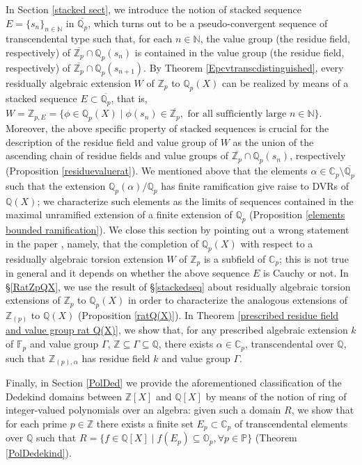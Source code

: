 \documentclass[10pt]{article}
\numberwithin{equation}{section}
\theoremstyle{definition}\newtheorem{Def}[equation]{Definition}
\theoremstyle{definition}\newtheorem{Ques}[equation]{Question}
\newcommand{\F}{\mathbb{F}}
\newcommand{\Q}{\mathbb{Q}}
\newcommand{\N}{\mathbb{N}}
\newcommand{\Z}{\mathbb{Z}}
\renewcommand{\O}{\mathbb{O}}
\newcommand{\C}{\mathbb{C}}
\newcommand{\PP}{\mathbb{P}}
\newcommand{\oQp}{\overline{\Q_p}}
\newcommand{\oZp}{\overline{\Z_p}}
\begin{document}
In Section \ref{stacked sect}, we introduce the notion of stacked sequence $E=\{s_n\}_{n\in\N}$ in $\oQp$, which turns out to be a pseudo-convergent sequence  of transcendental type such that, for each $n\in\N$, the value group (the residue field, respectively) of $\oZp\cap\Q_p(s_n)$ is contained in the value group (the residue field, respectively) of $\oZp\cap\Q_p(s_{n+1})$. By Theorem \ref{Epcvtranscdistinguished}, every residually algebraic extension $W$ of $\Z_p$ to $\Q_p(X)$ can be realized by means of a stacked sequence $E\subset\oQp$, that is, $W=\Z_{p,E}=\{\phi\in\Q_p(X)\mid\phi(s_n)\in\oZp,\text{ for all sufficiently large }n\in\N\}$. Moreover, the above specific property of stacked sequences is crucial for the description of the residue field and value group of $W$ as the union of the ascending chain of residue fields and value groups of $\oZp\cap\Q_p(s_n)$, respectively  (Proposition \ref{residuevaluerat}).  We mentioned above that the elements $\alpha\in\C_p\setminus\oQp$ such that the extension $\Q_p(\alpha)/\Q_p$ has finite ramification give raise to DVRs of $\Q(X)$; we characterize such elements as the limits of sequences contained in the maximal unramified extension of a finite extension of $\Q_p$ (Proposition \ref{elements bounded ramification}). We close this section by pointing out a wrong statement in the paper \cite{IovZah}, namely, that the completion of $\Q_p(X)$ with respect to a residually algebraic torsion extension $W$ of $\Z_p$ is a subfield of $\C_p$; this is not true in general and  it depends on whether the above sequence $E$ is Cauchy or not. In \S \ref{RatZpQX}, we use the result of \S \ref{stackedseq} about residually algebraic torsion extensions of $\Z_p$ to $\Q_p(X)$ in order to characterize the analogous extensions of $\Z_{(p)}$ to $\Q(X)$ (Proposition \ref{ratQ(X)}). In Theorem \ref{prescribed residue field and value group rat Q(X)}, we show that, for any prescribed algebraic extension $k$ of $\F_p$ and value group $\Gamma$, $\Z\subseteq\Gamma\subseteq\Q$, there exists  $\alpha\in\C_p$, transcendental over $\Q$, such that $\Z_{(p),\alpha}$ has residue field $k$ and value group $\Gamma$. 


Finally, in Section \ref{PolDed} we provide the aforementioned classification of the Dedekind domains between $\Z[X]$ and $\Q[X]$ by means of the notion of ring of integer-valued polynomials over an algebra: given such a domain $R$, we show that for each prime  $p\in\Z$ there exists a finite set $E_p\subset\C_p$  of transcendental elements over $\Q$ such that $R=\{f\in\Q[X] \mid f(E_p)\subseteq \O_p,\forall p\in\PP\}$ (Theorem \ref{PolDedekind}).
\end{document}
